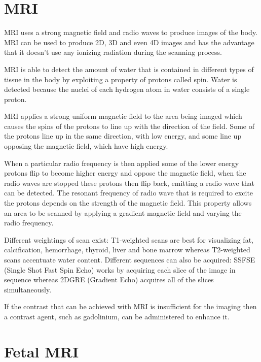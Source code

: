\newpage
\section{MRI}\label{background:mri}
MRI uses a strong magnetic field and radio waves to produce images of the body. MRI can be used to produce 2D, 3D and even 4D images and has the advantage that it doesn’t use any ionizing radiation during the scanning process\cite{howmriworks}.

MRI is able to detect the amount of water that is contained in different types of tissue in the body by exploiting a property of protons called spin. Water is detected because the nuclei of each hydrogen atom in water consists of a single proton.

MRI applies a strong uniform magnetic field to the area being imaged which causes the spins of the protons to line up with the direction of the field. Some of the protons line up in the same direction, with low energy, and some line up opposing the magnetic field, which have high energy.

When a particular radio frequency is then applied some of the lower energy protons flip to become higher energy and oppose the magnetic field, when the radio waves are stopped these protons then flip back, emitting a radio wave that can be detected. The resonant frequency of radio wave that is required to excite the protons depends on the strength of the magnetic field. This property allows an area to be scanned by applying a gradient magnetic field and varying the radio frequency.

Different weightings of scan exist: T1-weighted scans are best for visualizing fat, calcification, hemorrhage, thyroid, liver and bone marrow whereas T2-weighted scans accentuate water content. Different sequences can also be acquired: SSFSE (Single Shot Fast Spin Echo) works by acquiring each slice of the image in sequence whereas 2DGRE (Gradient Echo) acquires all of the slices simultaneously.

If the contrast that can be achieved with MRI is insufficient for the imaging then a contrast agent, such as gadolinium, can be administered to enhance it.

\section{Fetal MRI}\label{background:fetalmri}

